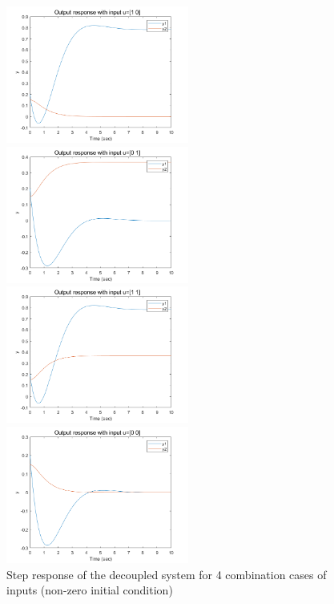 \documentclass[hyperref]{article}
\theoremstyle{nonumberplain}
\begin{document}
	\begin{figure}[H]
		\centering
		\begin{minipage}[t]{0.48\textwidth}
			\centering
			\includegraphics[width=6cm]{fig32.png}
		\end{minipage}
		\begin{minipage}[t]{0.48\textwidth}
			\centering
			\includegraphics[width=6cm]{fig33.png}
		\end{minipage}
		\begin{minipage}[t]{0.48\textwidth}
			\centering
			\includegraphics[width=6cm]{fig34.png}
		\end{minipage}
		\begin{minipage}[t]{0.48\textwidth}
			\centering
			\includegraphics[width=6cm]{fig35.png}
		\end{minipage}
		\caption{Step response of the decoupled system for 4 combination cases of inputs (non-zero initial condition)}
		\label{fig22}
	\end{figure}
	
\end{document}
